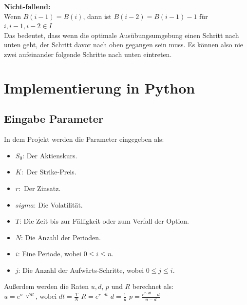 \documentclass[12pt,a4paper]{article}
\begin{document}
\begin{text}
\newpage
\textbf{Nicht-fallend:}
\\
Wenn $B(i-1) = B(i)$, dann ist $B(i-2) = B(i-1) -1$ für  $i, i-1, i-2 \in I$
\\
Das bedeutet, dass wenn die optimale Ausübungsumgebung einen Schritt nach unten geht, der Schritt davor nach oben gegangen sein muss. Es können also nie zwei aufeinander folgende Schritte nach unten eintreten.\\

\section{Implementierung in Python}
\subsection{Eingabe Parameter}
In dem Projekt werden die Parameter eingegeben als: 
\begin{itemize}
    \item $S_0$: Der Aktienskurs.
    \item $K:$ Der Strike-Preis.
    \item $r:$ Der Zinsatz.
    \item $sigma$: Die Volatilität.
    \item $T$: Die Zeit bis zur Fälligkeit oder zum Verfall der Option.
    \item $N$: Die Anzahl der Perioden.
    \item $i$: Eine Periode, wobei $0 \leqslant i \leqslant n $. 
    \item $j$: Die Anzahl der Aufwärts-Schritte, wobei $0 \leqslant j \leqslant i $.
\end{itemize}
Außerdem werden die Raten $u,d$, $p$ und $R$ berechnet als:\\[0,3 cm]
$u= e ^{ \sigma \cdot \sqrt{dt}}$, wobei $dt= \frac{T}{N}$ \hspace{1cm} $R = e^{r\cdot dt}$
\hspace{1cm} $d = \frac{1}{u}$ \hspace{1cm} $p= \frac{e^{r \cdot dt}-d}{u-d}$

\newpage

\end{text}
\end{document}
